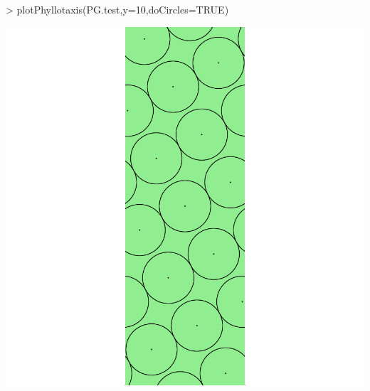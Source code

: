 \documentclass[a4paper]{article}
\begin{document}
\begin{Schunk}
\begin{Sinput}
> plotPhyllotaxis(PG.test,y=10,doCircles=TRUE)
\end{Sinput}
\end{Schunk}
\includegraphics{figdir/fig-041}
\end{document}
